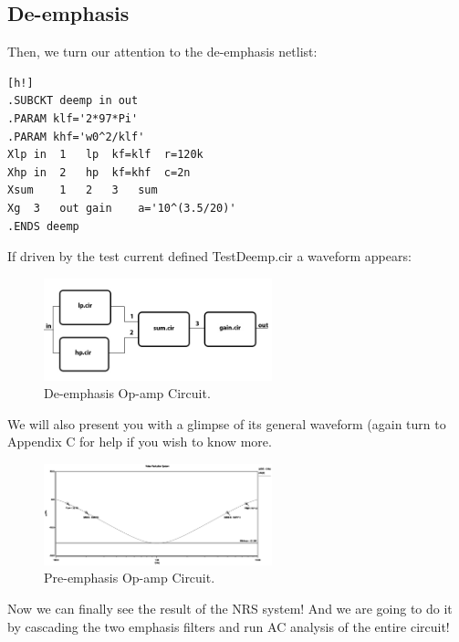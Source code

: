 \documentclass[report]{IEEEtran}
\begin{document}
	\subsection{De-emphasis}
		Then, we turn our attention to the de-emphasis netlist:
		\begin{center}
		\begin{lstlisting}[caption=De-emphasis netlist.][h!]
.SUBCKT deemp in out
.PARAM klf='2*97*Pi'
.PARAM khf='w0^2/klf'
Xlp	in	1	lp	kf=klf	r=120k
Xhp	in	2	hp	kf=khf	c=2n
Xsum	1	2	3	sum
Xg	3	out	gain	a='10^(3.5/20)'
.ENDS deemp
		\end{lstlisting}
		\end{center}
		If driven by the test current defined TestDeemp.cir a waveform appears:
		\begin{figure}[h!]
			\label{deemp.cir}
			\includegraphics[width=250px]{deemp-sim.jpg}
			\caption{De-emphasis Op-amp Circuit.}
		\end{figure}
		
		We will also present you with a glimpse of its general waveform (again turn to Appendix C for help if you wish to know more.
		\begin{figure}[h!]
			\label{deepm-plot.cir}
			\includegraphics[width=250px]{deemp_plot.eps}
			\caption{Pre-emphasis Op-amp Circuit.}
		\end{figure}
		
	Now we can finally see the result of the NRS system! And we are going to do it by cascading the two emphasis filters and run AC analysis of the entire circuit!
	
\end{document}
